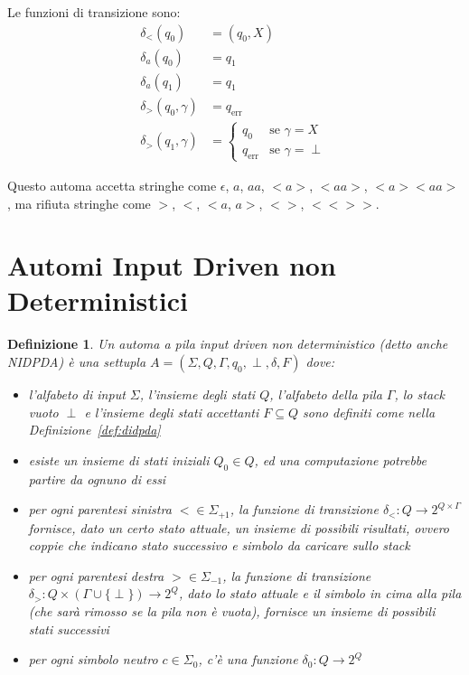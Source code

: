 \documentclass[a4paper,12pt]{report}
\newtheorem{definition}{Definizione}[chapter]
\theoremstyle{propositionstyle}
\begin{document}
    Le funzioni di transizione sono:
    \begin{align}
        \delta_{<}(q_0) &= (q_0, X) \\
        \delta_{a}(q_0) &= q_1 \\
        \delta_{a}(q_1) &= q_1 \\
        \delta_{>}(q_0, \gamma) &= q_{\text{err}} \\
        \delta_{>}(q_1, \gamma) &= \begin{cases}
                                       q_0 & \text{se } \gamma = X \\
                                       q_{\text{err}} & \text{se } \gamma = \perp
        \end{cases}
    \end{align}

    Questo automa accetta stringhe come $\epsilon$, $a$, $aa$, $<a>$, $<aa>$, $<a><aa>$, ma rifiuta stringhe come $>$, $<$, $<a$, $a>$, $<>$, $<<>>$.


    \section{Automi Input Driven non Deterministici}

    \begin{definition}
        Un \textit{automa a pila input driven non deterministico} (detto anche NIDPDA) è una settupla $A = \left(\Sigma, Q, \Gamma, q_0, \perp, \delta, F\right)$ dove:
        \begin{itemize}
            \item l'alfabeto di input $\Sigma$, l'insieme degli stati $Q$, l'alfabeto della pila $\Gamma$, lo stack vuoto $\perp$ e l'insieme degli stati accettanti $F \subseteq Q$ sono definiti come nella Definizione~\ref{def:didpda}
            \item esiste un insieme di stati iniziali $Q_0 \in Q$, ed una computazione potrebbe partire da ognuno di essi
            \item per ogni parentesi sinistra $< \in \Sigma_{+1}$, la funzione di transizione $\delta_{<} : Q \rightarrow 2^{Q \times \Gamma}$ fornisce, dato un certo stato attuale, un insieme di possibili risultati, ovvero coppie che indicano stato successivo e simbolo da caricare sullo stack
            \item per ogni parentesi destra $> \in \Sigma_{-1}$, la funzione di transizione $\delta_{>} : Q \times \left(\Gamma \cup \{\perp\}\right) \rightarrow 2^Q$, dato lo stato attuale e il simbolo in cima alla pila (che sarà rimosso se la pila non è vuota), fornisce un insieme di possibili stati successivi
            \item per ogni simbolo neutro $c \in \Sigma_{0}$, c'è una funzione $\delta_{0} : Q \rightarrow 2^Q$
        \end{itemize}
    \end{definition}
\end{document}
